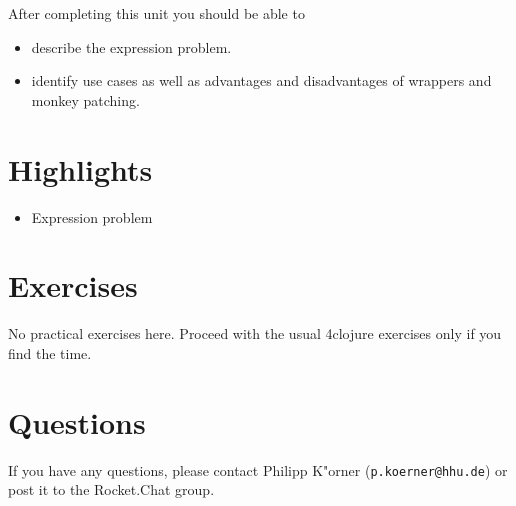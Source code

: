 \documentclass[11pt,a4paper]{article}
\begin{document}
After completing this unit you should be able to

\begin{itemize}
    \item describe the expression problem.
    \item identify use cases as well as advantages and disadvantages of wrappers and monkey patching.
\end{itemize}

\section{Highlights}

\begin{itemize}
    \item Expression problem
\end{itemize}



\section{Exercises}

No practical exercises here.
Proceed with the usual 4clojure exercises
only if you find the time.


%
%


	\section*{Questions}
	If you have any questions, please contact Philipp K"orner (\texttt{p.koerner@hhu.de}) or post it to the Rocket.Chat group.
\end{document}
